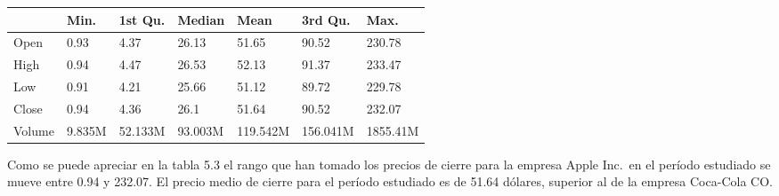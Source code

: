 \documentclass[]{article}
\begin{document}
\begin{table}[H]
\centering\begingroup\fontsize{10}{12}\selectfont

\begin{tabular}{l|l|l|l|l|l|l}
\hline
  & Min. & 1st Qu. & Median & Mean & 3rd Qu. & Max.\\
\hline
Open & 0.93 & 4.37 & 26.13 & 51.65 & 90.52 & 230.78\\
\hline
High & 0.94 & 4.47 & 26.53 & 52.13 & 91.37 & 233.47\\
\hline
Low & 0.91 & 4.21 & 25.66 & 51.12 & 89.72 & 229.78\\
\hline
Close & 0.94 & 4.36 & 26.1 & 51.64 & 90.52 & 232.07\\
\hline
Volume & 9.835M & 52.133M & 93.003M & 119.542M & 156.041M & 1855.41M\\
\hline
\end{tabular}\endgroup{}
\end{table}

\setlength\parskip{5ex}
\justifying

Como se puede apreciar en la tabla 5.3 el rango que han tomado los
precios de cierre para la empresa Apple Inc.~en el período estudiado se
mueve entre 0.94 y 232.07. El precio medio de cierre para el período
estudiado es de 51.64 dólares, superior al de la empresa Coca-Cola CO.
\end{document}
